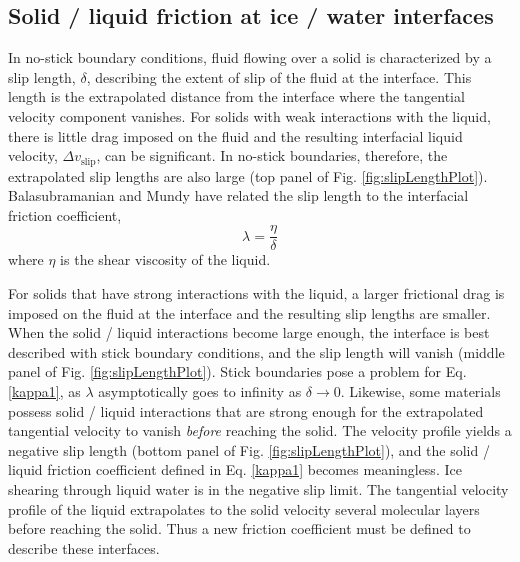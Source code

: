 \subsection{Solid / liquid friction at ice / water interfaces}
In no-stick boundary conditions, fluid flowing over a solid is
characterized by a slip length, $\delta$, describing the extent of
slip of the fluid at the interface. This length is the extrapolated
distance from the interface where the tangential velocity component
vanishes. For solids with weak interactions with the liquid, there is
little drag imposed on the fluid and the resulting interfacial liquid
velocity, $\Delta v_\mathrm{slip}$, can be significant. In no-stick
boundaries, therefore, the extrapolated slip lengths are also large
(top panel of Fig. \ref{fig:slipLengthPlot}).  Balasubramanian and
Mundy have related the slip length to the interfacial friction
coefficient, 
\begin{equation}\label{kappa1}
\lambda = \frac{\eta}{\delta}
\end{equation}
where $\eta$ is the shear viscosity of the
liquid.\cite{Balasubramanian1999}

For solids that have strong interactions with the liquid, a larger
frictional drag is imposed on the fluid at the interface and the
resulting slip lengths are smaller. When the solid / liquid interactions
become large enough, the interface is best described with stick
boundary conditions, and the slip length will vanish (middle panel of
Fig. \ref{fig:slipLengthPlot}).  Stick boundaries pose a problem for
Eq.  \eqref{kappa1}, as $\lambda$ asymptotically goes to infinity as
$\delta \rightarrow 0$.  Likewise, some materials possess solid / liquid
interactions that are strong enough for the extrapolated tangential
velocity to vanish \textit{before} reaching the solid. The velocity
profile yields a negative slip length (bottom panel of Fig.
\ref{fig:slipLengthPlot}), and the solid / liquid friction coefficient
defined in Eq. \eqref{kappa1} becomes meaningless.  Ice shearing
through liquid water is in the negative slip limit. The tangential
velocity profile of the liquid extrapolates to the solid velocity
several molecular layers before reaching the solid. Thus a new
friction coefficient must be defined to describe these interfaces.

